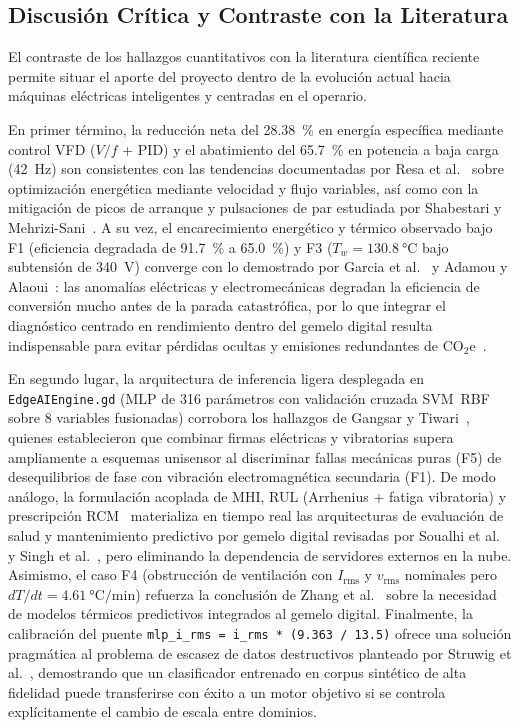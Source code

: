 \subsection{Discusión Crítica y Contraste con la Literatura}

El contraste de los hallazgos cuantitativos con la literatura científica reciente permite situar el aporte del proyecto dentro de la evolución actual hacia máquinas eléctricas inteligentes y centradas en el operario.

En primer término, la reducción neta del \qty{28.38}{\percent} en energía específica mediante control VFD ($V/f$ + PID) y el abatimiento del \qty{65.7}{\percent} en potencia a baja carga (\qty{42}{\hertz}) son consistentes con las tendencias documentadas por Resa et al.~\cite{Resa2019} sobre optimización energética mediante velocidad y flujo variables, así como con la mitigación de picos de arranque y pulsaciones de par estudiada por Shabestari y Mehrizi-Sani~\cite{Shabestari2019}. A su vez, el encarecimiento energético y térmico observado bajo F1 (eficiencia degradada de \qty{91.7}{\percent} a \qty{65.0}{\percent}) y F3 ($T_w=\qty{130.8}{\celsius}$ bajo subtensión de \qty{340}{\volt}) converge con lo demostrado por Garcia et al.~\cite{Garcia2019} y Adamou y Alaoui~\cite{Adamou2024}: las anomalías eléctricas y electromecánicas degradan la eficiencia de conversión mucho antes de la parada catastrófica, por lo que integrar el diagnóstico centrado en rendimiento dentro del gemelo digital resulta indispensable para evitar pérdidas ocultas y emisiones redundantes de $\text{CO}_2\text{e}$~\cite{UPME2024}.

En segundo lugar, la arquitectura de inferencia ligera desplegada en \texttt{EdgeAIEngine.gd} (MLP de \num{316} parámetros con validación cruzada SVM~RBF sobre 8 variables fusionadas) corrobora los hallazgos de Gangsar y Tiwari~\cite{Gangsar2020}, quienes establecieron que combinar firmas eléctricas y vibratorias supera ampliamente a esquemas unisensor al discriminar fallas mecánicas puras (F5) de desequilibrios de fase con vibración electromagnética secundaria (F1). De modo análogo, la formulación acoplada de MHI, RUL (Arrhenius + fatiga vibratoria) y prescripción RCM~\cite{Moubray1997} materializa en tiempo real las arquitecturas de evaluación de salud y mantenimiento predictivo por gemelo digital revisadas por Soualhi et al.~\cite{Soualhi2022} y Singh et al.~\cite{Singh2023}, pero eliminando la dependencia de servidores externos en la nube. Asimismo, el caso F4 (obstrucción de ventilación con $I_{\text{rms}}$ y $v_{\text{rms}}$ nominales pero $dT/dt=\qty{4.61}{\celsius\per\minute}$) refuerza la conclusión de Zhang et al.~\cite{Thermal2025} sobre la necesidad de modelos térmicos predictivos integrados al gemelo digital. Finalmente, la calibración del puente \texttt{mlp\_i\_rms = i\_rms * (9.363 / 13.5)} ofrece una solución pragmática al problema de escasez de datos destructivos planteado por Struwig et al.~\cite{AI2026}, demostrando que un clasificador entrenado en corpus sintético de alta fidelidad puede transferirse con éxito a un motor objetivo si se controla explícitamente el cambio de escala entre dominios.

